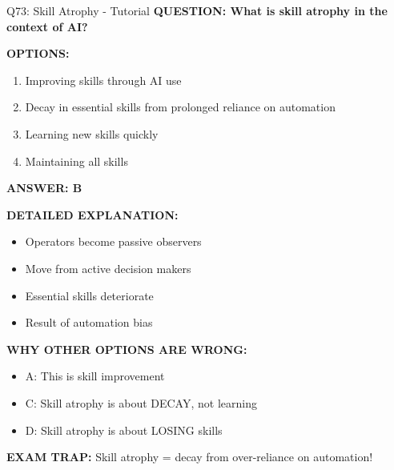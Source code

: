 \documentclass[8pt]{beamer}
\begin{document}
	\begin{frame}{Q73: Skill Atrophy - Tutorial}
		\fontsize{6.5}{7.5}\selectfont
		\textbf{QUESTION: What is skill atrophy in the context of AI?}
		
		\vspace{0.1cm}
		\textbf{OPTIONS:}
		\begin{enumerate}
			\item Improving skills through AI use
			\item Decay in essential skills from prolonged reliance on automation
			\item Learning new skills quickly
			\item Maintaining all skills
		\end{enumerate}
		
		\vspace{0.1cm}
		\textcolor{myblue}{\textbf{ANSWER: B}}
		
		\vspace{0.1cm}
		\textbf{DETAILED EXPLANATION:}
		\begin{itemize}
			\item Operators become passive observers
			\item Move from active decision makers
			\item Essential skills deteriorate
			\item Result of automation bias
		\end{itemize}
		
		\vspace{0.1cm}
		\textcolor{myred}{\textbf{WHY OTHER OPTIONS ARE WRONG:}}
		\begin{itemize}
			\item \textcolor{myred}{A:} This is skill improvement
			\item \textcolor{myred}{C:} Skill atrophy is about DECAY, not learning
			\item \textcolor{myred}{D:} Skill atrophy is about LOSING skills
		\end{itemize}
		
		\textcolor{myred}{\textbf{EXAM TRAP:}} Skill atrophy = \textcolor{myblue}{decay from over-reliance on automation}!
	\end{frame}
	
\end{document}
